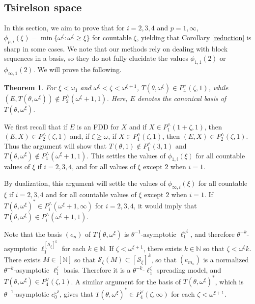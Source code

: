 \documentclass[12pt]{amsart}
\newtheorem{theorem}{Theorem}[section]
\theoremstyle{definition}
\newcommand{\infin}{[\mathbb{N}]}
\newcommand{\nn}{\mathbb{N}}
\newcommand{\sss}{\mathcal{S}}
\begin{document}
\subsection{Tsirelson space} In this section, we aim to prove that for $i=2,3,4$ and $p=1,\infty$, $\phi_{p,i}(\xi)=\min \{\omega^\zeta: \omega^\zeta\geqslant \xi\}$ for countable $\xi$, yielding that Corollary \ref{reduction} is sharp in some cases.  We note that our methods rely on dealing with block sequences in a basis, so they do not fully elucidate the values $\phi_{1,1}(2)$ or $\phi_{\infty,1}(2)$.  We will prove the following.  

\begin{theorem} For $\xi<\omega_1$ and $\omega^\xi<\zeta<\omega^{\xi+1}$, $T(\theta, \omega^\xi)\in P_4^\vee(\zeta, 1)$, while $(E, T(\theta, \omega^\xi))\notin P^\wedge_2(\omega^\xi+1, 1)$.  Here, $E$ denotes the canonical basis of $T(\theta, \omega^\xi)$.  

\label{tsirelson}

\end{theorem}

We first recall that if $E$ is an FDD for $X$ and if $X\in P_1^\wedge(1+\zeta, 1)$, then $(E,X)\in P_2^\wedge(\zeta, 1)$ and, if $\zeta\geqslant \omega$, if $X\in P_1^\wedge(\zeta, 1)$, then $(E,X)\in P_2^\wedge(\zeta, 1)$. Thus the argument will show that $T(\theta, 1)\notin P_1^\wedge(3, 1)$ and $T(\theta, \omega^\xi)\notin P_1^\wedge(\omega^\xi+1, 1)$.  This settles the values of $\phi_{1,i}(\xi)$ for  all countable values of $\xi$ if $i=2,3,4$, and for all values of $\xi$ except $2$ when $i=1$.  

By dualization, this argument will settle the values of $\phi_{\infty,i}(\xi)$ for all countable $\xi$ if $i=2,3,4$ and for all countable values of $\xi$ except $2$ when $i=1$. If $T(\theta, \omega^\xi)^*\in P_i^\wedge(\omega^\xi+1, \infty)$ for $i=2,3,4$, it would imply that $T(\theta, \omega^\xi)\in P_i^\wedge(\omega^\xi+1, 1)$.  

Note that the basis $(e_n)$ of $T(\theta, \omega^\xi)$ is $\theta^{-1}$-asymptotic $\ell_1^{\omega^\xi}$, and therefore $\theta^{-k}$-asymptotic $\ell_1^{[\sss_\xi]^k}$ for each $k\in\nn$.  If $\zeta< \omega^{\xi+1}$, there exists $k\in \nn$ so that $\zeta<\omega^\xi k$.  There exists $M\in \infin$ so that $\sss_\zeta(M)\subset [\sss_\xi]^k$, so that $(e_{m_n})$ is a normalized $\theta^{-k}$-asymptotic $\ell_1^\zeta$ basis.  Therefore it is a $\theta^{-k}$-$\ell_1^\zeta$ spreading model, and $T(\theta, \omega^\xi)\in P_4^\vee(\zeta, 1)$.  A similar argument for the basis of $T(\theta, \omega^\xi)^*$, which is $\theta^{-1}$-asymptotic $c_0^{\omega^\xi}$, gives that $T(\theta, \omega^\xi)^*\in P_4^\vee(\zeta, \infty)$ for each $\zeta< \omega^{\xi+1}$.  
\end{document}
